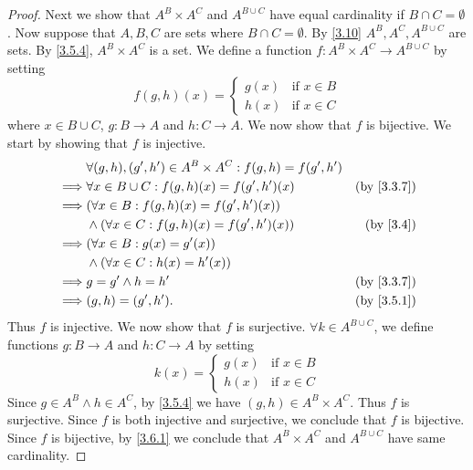 \begin{proof}
  Next we show that \(A^B \times A^C\) and \(A^{B \cup C}\) have equal cardinality if \(B \cap C = \emptyset\).
  Now suppose that \(A, B, C\) are sets where \(B \cap C = \emptyset\).
  By \cref{3.10} \(A^B, A^C, A^{B \cup C}\) are sets.
  By \cref{3.5.4}, \(A^B \times A^C\) is a set.
  We define a function \(f : A^B \times A^C \to A^{B \cup C}\) by setting
  \[
    f(g, h)(x) = \begin{cases}
      g(x) & \text{if } x \in B \\
      h(x) & \text{if } x \in C
    \end{cases}
  \]
  where \(x \in B \cup C\), \(g : B \to A\) and \(h : C \to A\).
  We now show that \(f\) is bijective.
  We start by showing that \(f\) is injective.
  \begin{align*}
             & \forall (g, h), (g', h') \in A^B \times A^C : f(g, h) = f(g', h')                            \\
    \implies & \forall x \in B \cup C : f(g, h)(x) = f(g', h')(x)                & \text{(by \cref{3.3.7})} \\
    \implies & (\forall x \in B : f(g, h)(x) = f(g', h')(x))                                                \\
             & \land (\forall x \in C : f(g, h)(x) = f(g', h')(x))               & \text{(by \cref{3.4})}   \\
    \implies & (\forall x \in B : g(x) = g'(x))                                                             \\
             & \land (\forall x \in C : h(x) = h'(x))                                                       \\
    \implies & g = g' \land h = h'                                               & \text{(by \cref{3.3.7})} \\
    \implies & (g, h) = (g', h').                                                & \text{(by \cref{3.5.1})}
  \end{align*}
  Thus \(f\) is injective.
  We now show that \(f\) is surjective.
  \(\forall k \in A^{B \cup C}\), we define functions \(g : B \to A\) and \(h : C \to A\) by setting
  \[
    k(x) = \begin{cases}
      g(x) & \text{if } x \in B \\
      h(x) & \text{if } x \in C
    \end{cases}
  \]
  Since \(g \in A^B \land h \in A^C\), by \cref{3.5.4} we have \((g, h) \in A^B \times A^C\).
  Thus \(f\) is surjective.
  Since \(f\) is both injective and surjective, we conclude that \(f\) is bijective.
  Since \(f\) is bijective, by \cref{3.6.1} we conclude that \(A^B \times A^C\) and \(A^{B \cup C}\) have same cardinality.


\end{proof}
